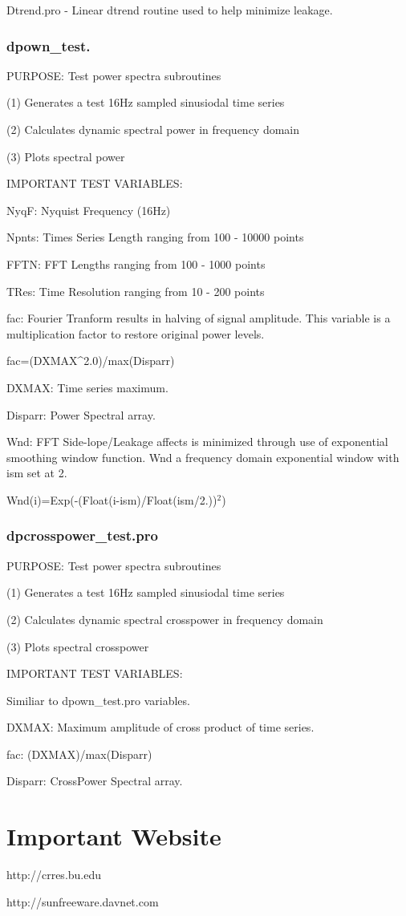 Dtrend.pro - Linear dtrend routine used to help minimize leakage.

\subsubsection{dpown_test.} 

PURPOSE: Test power spectra subroutines  

(1) Generates a test 16Hz sampled sinusiodal time series

(2) Calculates dynamic spectral power in frequency domain

(3) Plots spectral power


IMPORTANT TEST VARIABLES:

NyqF: Nyquist Frequency (16Hz)

Npnts: Times Series Length ranging from 100 - 10000 points

FFTN: FFT Lengths ranging from 100 - 1000 points
 
TRes: Time Resolution ranging from 10 - 200 points

fac: Fourier Tranform results in halving of signal amplitude. This variable is a multiplication factor to restore original power levels. 

fac=(DXMAX^2.0)/max(Disparr)

DXMAX: Time series maximum. 

Disparr: Power Spectral array.

Wnd: FFT Side-lope/Leakage affects is minimized through use of exponential smoothing window function. Wnd a frequency domain exponential window with ism set at 2.

Wnd(i)=Exp(-(Float(i-ism)/Float(ism/2.))$^2$)

\subsubsection{dpcrosspower_test.pro}

PURPOSE: Test power spectra subroutines  

(1) Generates a test 16Hz sampled sinusiodal time series

(2) Calculates dynamic spectral crosspower in frequency domain

(3) Plots spectral crosspower

IMPORTANT TEST VARIABLES:

Similiar to dpown_test.pro variables.

DXMAX: Maximum amplitude of cross product of time series.    

fac: (DXMAX)/max(Disparr)

Disparr: CrossPower Spectral array.


\section{Important Website}

http://crres.bu.edu

http://sunfreeware.davnet.com







